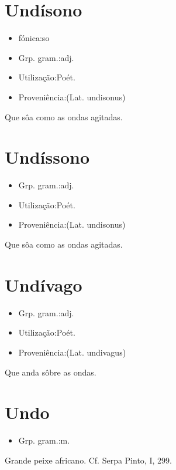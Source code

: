 \documentclass{article}
\begin{document}
\section{Undísono}
\begin{itemize}
\item {fónica:so}
\end{itemize}
\begin{itemize}
\item {Grp. gram.:adj.}
\end{itemize}
\begin{itemize}
\item {Utilização:Poét.}
\end{itemize}
\begin{itemize}
\item {Proveniência:(Lat. \textunderscore undisonus\textunderscore )}
\end{itemize}
Que sôa como as ondas agitadas.
\section{Undíssono}
\begin{itemize}
\item {Grp. gram.:adj.}
\end{itemize}
\begin{itemize}
\item {Utilização:Poét.}
\end{itemize}
\begin{itemize}
\item {Proveniência:(Lat. \textunderscore undisonus\textunderscore )}
\end{itemize}
Que sôa como as ondas agitadas.
\section{Undívago}
\begin{itemize}
\item {Grp. gram.:adj.}
\end{itemize}
\begin{itemize}
\item {Utilização:Poét.}
\end{itemize}
\begin{itemize}
\item {Proveniência:(Lat. \textunderscore undivagus\textunderscore )}
\end{itemize}
Que anda sôbre as ondas.
\section{Undo}
\begin{itemize}
\item {Grp. gram.:m.}
\end{itemize}
Grande peixe africano. Cf. Serpa Pinto, I, 299.
\end{document}
